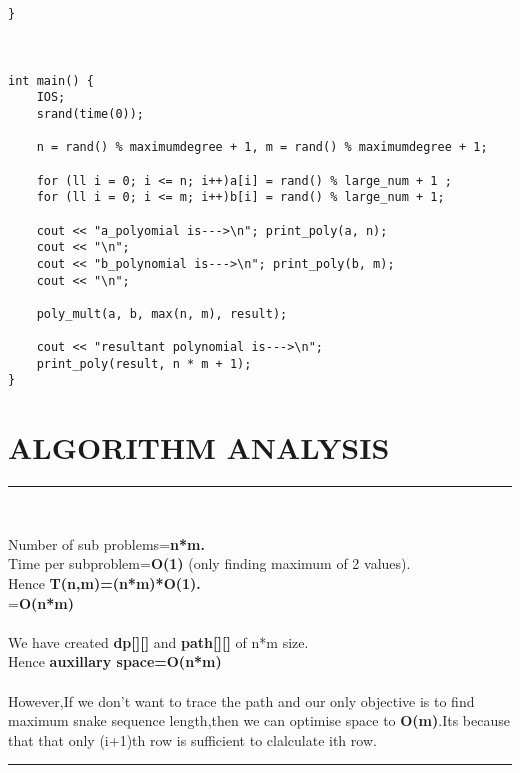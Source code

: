 \documentclass[10pt]{article}
\begin{document}
\begin{lstlisting}
}



int main() {
	IOS;
	srand(time(0));

	n = rand() % maximumdegree + 1, m = rand() % maximumdegree + 1;

	for (ll i = 0; i <= n; i++)a[i] = rand() % large_num + 1 ;
	for (ll i = 0; i <= m; i++)b[i] = rand() % large_num + 1;

	cout << "a_polyomial is--->\n"; print_poly(a, n);
	cout << "\n";
	cout << "b_polynomial is--->\n"; print_poly(b, m);
	cout << "\n";

	poly_mult(a, b, max(n, m), result);

	cout << "resultant polynomial is--->\n";
	print_poly(result, n * m + 1);
}
\end{lstlisting}
\fi


\section*{ALGORITHM ANALYSIS}

\rule{9cm}{1pt}\\
{
    Number of sub problems=\textbf{n*m.}\\
    Time per subproblem=\textbf{O(1)} (only finding maximum of 2 values).\\
    Hence \textbf{T(n,m)=(n*m)*O(1).}\\
                           =\textbf{O(n*m)\\\\}
    We have created \textbf{dp[][]} and \textbf{path[][]}  of n*m size.\\
    Hence \textbf{auxillary space=O(n*m)}\\\\
    However,If we don't want to trace the path and our only objective is to find maximum snake sequence length,then we can optimise space to \textbf{O(m)}.Its because that that only (i+1)th row is sufficient to clalculate ith row.


 }
\rule{9cm}{1pt}
\end{document}
